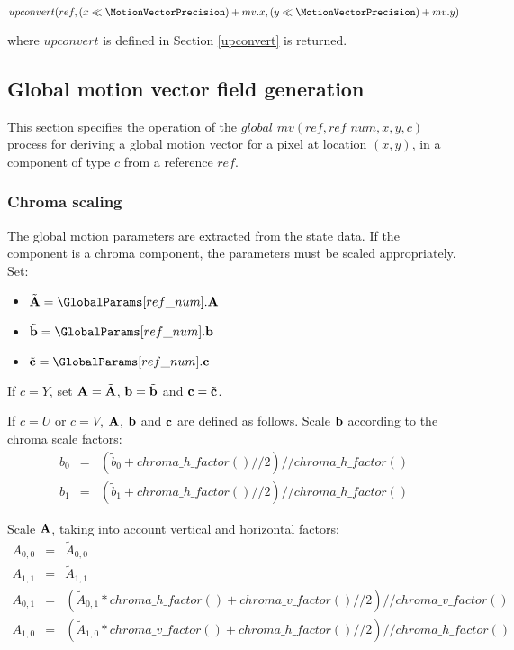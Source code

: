 $upconvert(ref, (x\ll \MotionVectorPrecision)+mv.x, (y\ll \MotionVectorPrecision)+mv.y)$ 

where $upconvert$ is defined in Section \ref{upconvert} is returned.
 
\subsection{Global motion vector field generation}
\label{globalmv}

This section specifies the operation of the $global\_mv(ref, ref\_num, x,y, c)$ process
for deriving a global motion vector for a pixel at location $(x,y)$, in a component of 
type $c$ from a reference $ref$.

\subsubsection{Chroma scaling}
\label{chromascaling}

The global motion parameters are extracted from the state data. If the component is a chroma
component, the parameters must be scaled appropriately. Set:

\begin{itemize}
\item $\tilde{\bf A}=\GlobalParams[ref\_num].{\bf A}$
\item $\tilde{\bf b}=\GlobalParams[ref\_num].{\bf b}$
\item $\tilde{\bf c}=\GlobalParams[ref\_num].{\bf c}$
\end{itemize}

If $c=Y$, set ${\bf A}=\tilde{\bf A}$, ${\bf b}=\tilde{\bf b}$ and ${\bf c}=\tilde{\bf c}$.

If $c=U$ or $c=V$, ${\bf A}$, ${\bf b}$ and ${\bf c}$ are defined as follows. Scale 
${\bf b}$ according to the chroma scale factors:
\begin{eqnarray*}
b_0 & = & \left(\tilde{b}_0+chroma\_h\_factor()//2\right)//chroma\_h\_factor() \\
b_1 & = & \left(\tilde{b}_1+chroma\_h\_factor()//2\right)//chroma\_h\_factor()
\end{eqnarray*}

Scale ${\bf A}$, taking into account vertical and horizontal factors:
\begin{eqnarray*}
A_{0,0} & = & \tilde{A}_{0,0}\\
A_{1,1} & = & \tilde{A}_{1,1}\\
A_{0,1} & = & \left(\tilde{A}_{0,1}*chroma\_h\_factor()+chroma\_v\_factor()//2 \right) // chroma\_v\_factor() \\
A_{1,0} & = & \left(\tilde{A}_{1,0}*chroma\_v\_factor()+chroma\_h\_factor()//2\right)//chroma\_h\_factor()
\end{eqnarray*}

